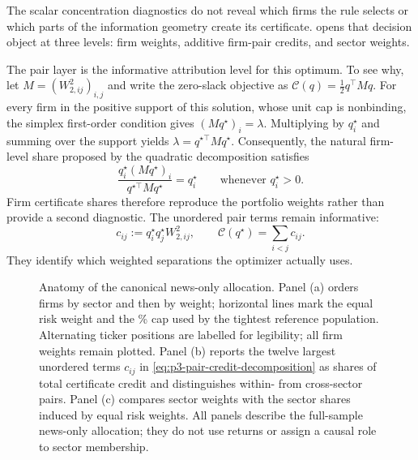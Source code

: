 The scalar concentration diagnostics do not reveal which firms the rule
selects or which parts of the information geometry create its certificate.
 opens that decision object at three levels:
firm weights, additive firm-pair credits, and sector weights.

The pair layer is the informative attribution level for this optimum.
To see why, let $M=(W_{2,ij}^{2})_{i,j}$ and write the zero-slack objective as
$\mathcal C(q)=\tfrac12q^{\top}Mq$.
For every firm in the positive support of this solution, whose unit cap is
nonbinding, the simplex first-order condition gives
$(Mq^{\star})_i=\lambda$.
Multiplying by $q_i^{\star}$ and summing over the support yields
$\lambda=q^{\star\top}Mq^{\star}$.
Consequently, the natural firm-level share proposed by the quadratic
decomposition satisfies
\begin{equation}\label{eq:p3-firm-credit-identity}
  \frac{q_i^{\star}(Mq^{\star})_i}
  {q^{\star\top}Mq^{\star}}=q_i^{\star}
  \qquad\text{whenever }q_i^{\star}>0.
\end{equation}
Firm certificate shares therefore reproduce the portfolio weights rather than
provide a second diagnostic.
The unordered pair terms remain informative:
\begin{equation}\label{eq:p3-pair-credit-decomposition}
  c_{ij}:=q_i^{\star}q_j^{\star}W_{2,ij}^{2},
  \qquad
  \mathcal C(q^{\star})=\sum_{i<j}c_{ij}.
\end{equation}
They identify which weighted separations the optimizer actually uses.

\begin{figure}[H]
  \centering
  \caption{Anatomy of the canonical news-only allocation. Panel (a)
    orders firms by sector and then by weight; horizontal lines mark the equal
    risk weight and the \% cap used by the
    tightest reference population.
    Alternating ticker positions are labelled for legibility; all
     firm weights remain plotted.
    Panel (b) reports the twelve largest unordered terms $c_{ij}$ in
    \eqref{eq:p3-pair-credit-decomposition} as shares of total certificate
    credit and distinguishes within- from cross-sector pairs. Panel (c)
    compares sector weights with the sector shares induced by equal risk
    weights. All panels describe the full-sample news-only allocation; they do
  not use returns or assign a causal role to sector membership.}
  \label{fig:p3-portfolio-anatomy}
\end{figure}

